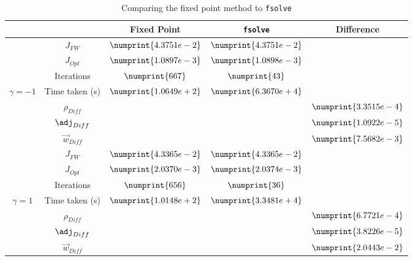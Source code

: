 \begin{table}
\begin{tabular}{ ||c|| c | c | c | c ||}
\hline
& & Fixed Point & \texttt{fsolve} & Difference   \\
\hline
 & $J_{FW}$ & $\numprint{4.3751e-2}$ & $\numprint{4.3751e-2}$ &   \\
 & $J_{Opt}$ & $\numprint{1.0897e-3}$ & $\numprint{1.0898e-3}$ &   \\
 & Iterations & $\numprint{667}$ & $\numprint{43}$ &   \\
$\gamma =-1$ & Time taken (s) & $\numprint{1.0649e+2}$ & $\numprint{6.3670e+4}$ &   \\
 & $\rho_{Diff}$ & & &$\numprint{3.3515e-4}$  \\
 & $\adj_{Diff}$ & & &$\numprint{1.0922e-5}$  \\
 & $\vec{w}_{Diff}$ & & & $\numprint{7.5682e-3}$  \\
\hline
 & $J_{FW}$ & $\numprint{4.3365e-2}$ & $\numprint{4.3365e-2}$ &   \\
 & $J_{Opt}$ & $\numprint{2.0370e-3}$ & $\numprint{2.0374e-3}$ &   \\
 & Iterations & $\numprint{656}$ & $\numprint{36}$ &   \\
$\gamma =1$ & Time taken (s) & $\numprint{1.0148e+2}$ & $\numprint{3.3481e+4}$ &   \\
 & $\rho_{Diff}$ & & &$\numprint{6.7721e-4}$  \\
 & $\adj_{Diff}$ & & &$\numprint{3.8226e-5}$  \\
 & $\vec{w}_{Diff}$ & & & $\numprint{2.0443e-2}$  \\
\hline
\end{tabular}
\caption{Comparing the fixed point method to \texttt{fsolve}}
\label{TabA3:Prob1}
\end{table}